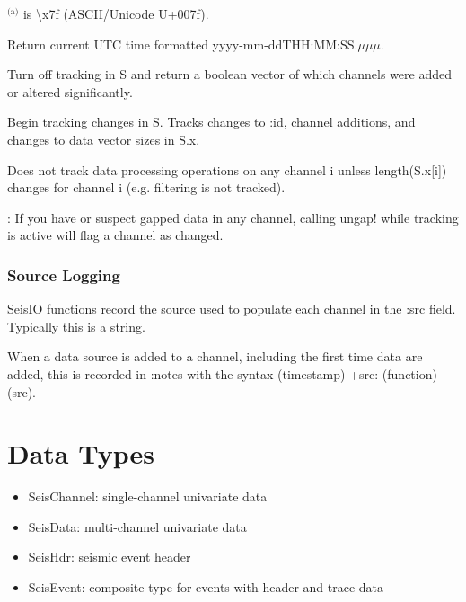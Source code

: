 \documentclass[letterpaper,11pt,english]{sphinxmanual}
\begin{document}
$^{\text{(a)}}$  is \textbackslash{}x7f (ASCII/Unicode U+007f).

\begin{fulllineitems}
\label{\detokenize{src/working_with_data:timestamp}}
\end{fulllineitems}


Return current UTC time formatted yyyy-mm-ddTHH:MM:SS.\(\mu\)\(\mu\)\(\mu\).


\begin{fulllineitems}
\end{fulllineitems}


Turn off tracking in S and return a boolean vector of which channels were added
or altered significantly.


\begin{fulllineitems}
\end{fulllineitems}


Begin tracking changes in S. Tracks changes to :id, channel additions, and
changes to data vector sizes in S.x.

Does not track data processing operations on any channel i unless
length(S.x{[}i{]}) changes for channel i (e.g. filtering is not tracked).

: If you have or suspect gapped data in any channel, calling
ungap! while tracking is active will flag a channel as changed.


\subsubsection{Source Logging}
\label{\detokenize{src/working_with_data:source-logging}}
SeisIO functions record the  source used to populate each channel in the
:src field. Typically this is a string.

When a data source is added to a channel, including the first time data are
added, this is recorded in :notes with the syntax (timestamp) +src: (function) (src).


\section{Data Types}
\label{\detokenize{src/seisdata:data-types}}\label{\detokenize{src/seisdata:seisdata}}\label{\detokenize{src/seisdata::doc}}\begin{itemize}
\item {} 
SeisChannel: single-channel univariate data

\item {} 
SeisData: multi-channel univariate data

\item {} 
SeisHdr: seismic event header

\item {} 
SeisEvent: composite type for events with header and trace data

\end{itemize}
\end{document}

